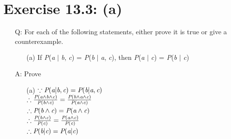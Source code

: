 \documentclass{article}
\begin{document}
\section{Exercise 13.3: (a)}
\begin{itemize}
\item[Q:]For each of the following statements, either prove it is true or give a counterexample.
\begin{itemize}
\item[(a)]If \textit P(\textit a $\vert$ \textit b, \textit c) = \textit P(\textit b $\vert$ \textit a, \textit c), then \textit P(\textit a $\vert$ \textit c) = \textit P(\textit b $\vert$ \textit c)
\end{itemize}
\item[A:]Prove
\begin{itemize}
\item[(a)]$\because \textit P(\textit a \vert \textit b, \textit c) = \textit P(\textit b \vert \textit a, \textit c)$\\$\therefore \frac{\textit P(\textit a \wedge \textit b \wedge \textit c)}{\textit P(\textit b \wedge \textit c)} = \frac{\textit P(\textit b \wedge \textit a \wedge \textit c)}{\textit P(\textit a \wedge \textit c)}$\\$\therefore \textit P(\textit b \wedge \textit c) = \textit P(\textit a \wedge \textit c)$\\$\therefore \frac{\textit P(\textit b \wedge \textit c)}{\textit P(\textit c)} = \frac{\textit P(\textit a \wedge \textit c)}{\textit P(\textit c)}$\\$\therefore \textit P(\textit b \vert \textit c) = \textit P(\textit a \vert \textit c)$
\end{itemize}
\end{itemize}
\end{document}
